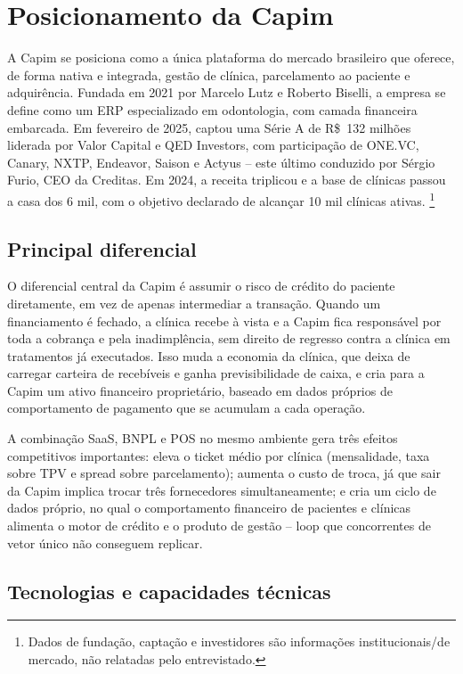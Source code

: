 \section{Posicionamento da Capim}

A Capim se posiciona como a única plataforma do mercado brasileiro que oferece, de forma nativa e integrada, gestão de clínica, parcelamento ao paciente e adquirência. Fundada em 2021 por Marcelo Lutz e Roberto Biselli, a empresa se define como um ERP especializado em odontologia, com camada financeira embarcada. Em fevereiro de 2025, captou uma Série A de R\$~132 milhões liderada por Valor Capital e QED Investors, com participação de ONE.VC, Canary, NXTP, Endeavor, Saison e Actyus -- este último conduzido por Sérgio Furio, CEO da Creditas. Em 2024, a receita triplicou e a base de clínicas passou a casa dos 6 mil, com o objetivo declarado de alcançar 10 mil clínicas ativas. \footnote{Dados de fundação, captação e investidores são informações institucionais/de mercado, não relatadas pelo entrevistado.}

\subsection{Principal diferencial}

O diferencial central da Capim é assumir o risco de crédito do paciente diretamente, em vez de apenas intermediar a transação. Quando um financiamento é fechado, a clínica recebe à vista e a Capim fica responsável por toda a cobrança e pela inadimplência, sem direito de regresso contra a clínica em tratamentos já executados. Isso muda a economia da clínica, que deixa de carregar carteira de recebíveis e ganha previsibilidade de caixa, e cria para a Capim um ativo financeiro proprietário, baseado em dados próprios de comportamento de pagamento que se acumulam a cada operação.

A combinação SaaS, BNPL e POS no mesmo ambiente gera três efeitos competitivos importantes: eleva o ticket médio por clínica (mensalidade, taxa sobre TPV e spread sobre parcelamento); aumenta o custo de troca, já que sair da Capim implica trocar três fornecedores simultaneamente; e cria um ciclo de dados próprio, no qual o comportamento financeiro de pacientes e clínicas alimenta o motor de crédito e o produto de gestão -- loop que concorrentes de vetor único não conseguem replicar.

\subsection{Tecnologias e capacidades técnicas}

